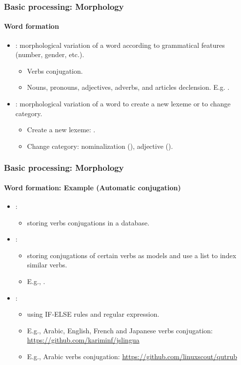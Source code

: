 \documentclass[xcolor=table]{beamer}
\begin{document}
\begin{frame}
\frametitle{Basic processing: Morphology}
\framesubtitle{Word formation}

\begin{itemize}
	\item {} : morphological variation of a word according to grammatical features (number, gender, etc.).
	\begin{itemize}
		\item Verbs conjugation.
		\item Nouns, pronouns, adjectives, adverbs, and articles declension. 
		E.g. .
	\end{itemize}
	\item {}: morphological variation of a word to create a new lexeme or to change category.
	\begin{itemize}
		\item Create a new lexeme: .
		\item Change category: nominalization (), adjective ().
	\end{itemize}
\end{itemize}

\end{frame}

\begin{frame}
\frametitle{Basic processing: Morphology}
\framesubtitle{Word formation: Example (Automatic conjugation)}

\begin{itemize}
	\item {}:
	\begin{itemize}
		\item storing verbs conjugations in a database.
	\end{itemize}
	\item {}:
	\begin{itemize}
		\item storing conjugations of certain verbs as models and use a list to index similar verbs.
		\item E.g., .
	\end{itemize}
	\item {}:
	\begin{itemize}
		\item using IF-ELSE rules and regular expression.
		\item E.g., Arabic, English, French and Japanese verbs conjugation: \url{https://github.com/kariminf/jslingua}
		\item E.g., Arabic verbs conjugation: \url{https://github.com/linuxscout/qutrub}
	\end{itemize}
\end{itemize}

\end{frame}
\end{document}
